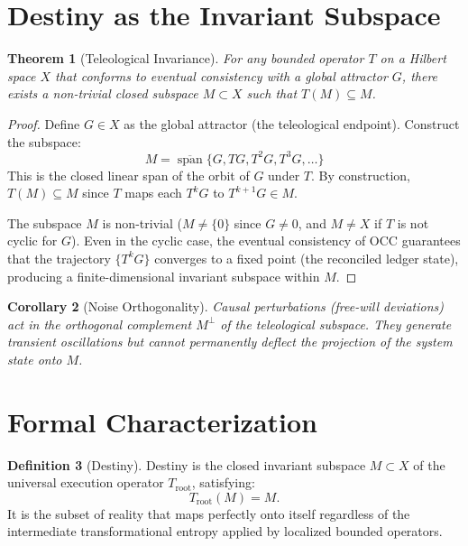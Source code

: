\documentclass[12pt, a4paper]{article}
\theoremstyle{plain}
\newtheorem{theorem}{Theorem}[section]
\newtheorem{corollary}[theorem]{Corollary}
\theoremstyle{definition}
\newtheorem{definition}[theorem]{Definition}
\begin{document}
\section{Destiny as the Invariant Subspace}\label{sec:destiny}

\begin{theorem}[Teleological Invariance]\label{thm:invariance}
For any bounded operator $T$ on a Hilbert space $X$ that conforms to eventual consistency with a global attractor $G$, there exists a non-trivial closed subspace $M \subset X$ such that $T(M) \subseteq M$.
\end{theorem}

\begin{proof}
Define $G \in X$ as the global attractor (the teleological endpoint). Construct the subspace:
\begin{equation}
    M = \overline{\operatorname{span}}\{G, TG, T^2 G, T^3 G, \ldots\}
\end{equation}
This is the closed linear span of the orbit of $G$ under $T$. By construction, $T(M) \subseteq M$ since $T$ maps each $T^k G$ to $T^{k+1} G \in M$.

The subspace $M$ is non-trivial ($M \neq \{0\}$ since $G \neq 0$, and $M \neq X$ if $T$ is not cyclic for $G$). Even in the cyclic case, the eventual consistency of OCC guarantees that the trajectory $\{T^k G\}$ converges to a fixed point (the reconciled ledger state), producing a finite-dimensional invariant subspace within $M$.
\end{proof}

\begin{corollary}[Noise Orthogonality]
Causal perturbations (free-will deviations) act in the orthogonal complement $M^\perp$ of the teleological subspace. They generate transient oscillations but cannot permanently deflect the projection of the system state onto $M$.
\end{corollary}

\section{Formal Characterization}\label{sec:formalization}

\begin{definition}[Destiny]
Destiny is the closed invariant subspace $M \subset X$ of the universal execution operator $T_{\text{root}}$, satisfying:
\begin{equation}
    T_{\text{root}}(M) = M.
\end{equation}
It is the subset of reality that maps perfectly onto itself regardless of the intermediate transformational entropy applied by localized bounded operators.
\end{definition}
\end{document}
